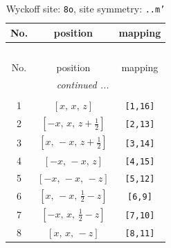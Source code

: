 \documentclass[fleqn,8pt]{jsarticle}
\begin{document}
\begin{longtable}{ccc}
\caption{Wyckoff site: {\tt 8o}, site symmetry: {\tt ..m'}}
 \\
 \hline \hline
No. & position & mapping \\ \hline \endfirsthead

\multicolumn{2}{l}{\tablename\ \thetable{}} \\
 \hline \hline
No. & position & mapping \\ \hline \endhead

 \hline \hline
\multicolumn{2}{r}{\footnotesize\it continued ...} \\ \endfoot

 \hline \hline
\multicolumn{2}{r}{} \\ \endlastfoot

1 & $\left[ x,\, x,\, z \right]$ & {\tt [1,16]} \\ \hline
2 & $\left[ - x,\, x,\, z + \frac{1}{2} \right]$ & {\tt [2,13]} \\ \hline
3 & $\left[ x,\, - x,\, z + \frac{1}{2} \right]$ & {\tt [3,14]} \\ \hline
4 & $\left[ - x,\, - x,\, z \right]$ & {\tt [4,15]} \\ \hline
5 & $\left[ - x,\, - x,\, - z \right]$ & {\tt [5,12]} \\ \hline
6 & $\left[ x,\, - x,\, \frac{1}{2} - z \right]$ & {\tt [6,9]} \\ \hline
7 & $\left[ - x,\, x,\, \frac{1}{2} - z \right]$ & {\tt [7,10]} \\ \hline
8 & $\left[ x,\, x,\, - z \right]$ & {\tt [8,11]} \\
\end{longtable}
\renewcommand{\arraystretch}{1.2}
\end{document}
